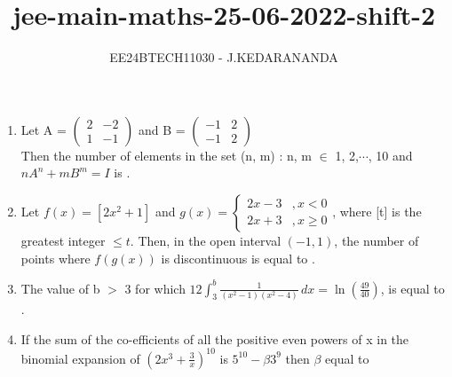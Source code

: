 \documentclass[journal]{IEEEtran}
\renewcommand{\thefigure}{\theenumi}
\renewcommand{\thetable}{\theenumi}
\numberwithin{equation}{enumi}
\numberwithin{figure}{enumi}
\renewcommand{\thetable}{\theenumi}
\begin{document}

\vspace{3cm}

\title{jee-main-maths-25-06-2022-shift-2}
\author{EE24BTECH11030 - J.KEDARANANDA}
{\let\newpage\relax\maketitle}
\renewcommand{\thefigure}{\theenumi}
\renewcommand{\thetable}{\theenumi}
\begin{enumerate}
    \item Let A = $\begin{pmatrix} 2 & -2 \\ 1 & -1 \end{pmatrix}$ and  B = $\begin{pmatrix} -1 & 2 \\ -1 & 2 \end{pmatrix}$\\
    Then the number of elements in the set {(n, m) : n, m $\in$ { 1, 2,$\cdots$, 10} and $nA^n + mB^m = I$} is \underline{\hspace{1cm}}.
    \bigskip
    
    \item Let $f(x) = [2x^2 + 1]$ and 
    $g(x) = \begin{cases} 
    2x - 3 & , x < 0 \\ 
    2x + 3 & , x \geq 0 
    \end{cases}$, where  [t] is the greatest integer $\leq t$. Then, in the open interval $(-1, 1)$, the number of points where $f(g(x))$ is discontinuous is equal to \underline{\hspace{1cm}}.
    \bigskip
    
    \item The value of b $>$ 3 for which $12\int_{3}^{b}\frac{1}{(x^2 - 1)(x^2 - 4)} \,dx = \ln{(\frac{49}{40})}$, is equal to \underline{\hspace{1cm}}.
    \bigskip
    
    \item If the sum of the co-efficients of all the positive even powers of x in the binomial expansion of $\left(2x^3 + \frac{3}{x}\right)^{10}$ is $5^{10} - {\beta}3^9$ then $\beta$ equal to \underline{\hspace{1cm}}
    \bigskip
    

\end{enumerate}
\end{document}
